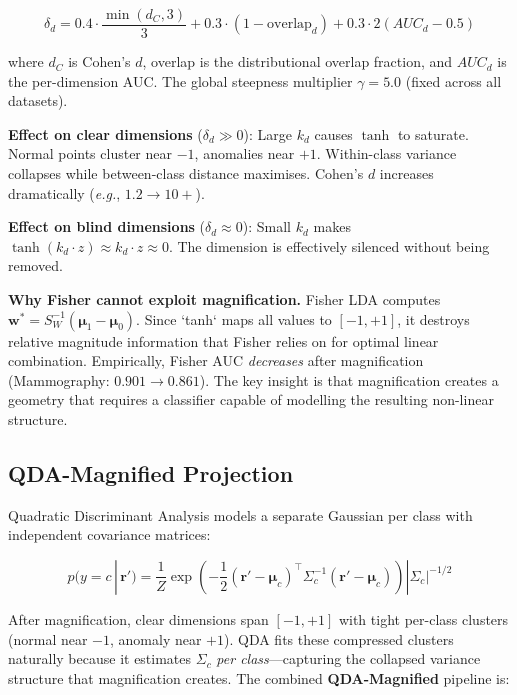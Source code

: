 \documentclass[journal]{IEEEtran}
\newcommand{\eg}{\textit{e.g.}}
\begin{document}
\begin{equation}
\delta_d = 0.4 \cdot \frac{\min(d_C, 3)}{3} + 0.3 \cdot (1 - \text{overlap}_d) + 0.3 \cdot 2(AUC_d - 0.5)
\label{eq:disc_score}
\end{equation}

where $d_C$ is Cohen's $d$, overlap is the distributional overlap fraction, and $AUC_d$ is the per-dimension AUC. The global steepness multiplier $\gamma = 5.0$ (fixed across all datasets).

\textbf{Effect on clear dimensions} ($\delta_d \gg 0$): Large $k_d$ causes $\tanh$ to saturate. Normal points cluster near $-1$, anomalies near $+1$. Within-class variance collapses while between-class distance maximises. Cohen's $d$ increases dramatically (\eg, $1.2 \to 10+$).

\textbf{Effect on blind dimensions} ($\delta_d \approx 0$): Small $k_d$ makes $\tanh(k_d \cdot z) \approx k_d \cdot z \approx 0$. The dimension is effectively silenced without being removed.

\textbf{Why Fisher cannot exploit magnification.} Fisher LDA computes $\mathbf{w}^* = S_W^{-1}(\boldsymbol{\mu}_1 - \boldsymbol{\mu}_0)$. Since `tanh` maps all values to $[-1, +1]$, it destroys relative magnitude information that Fisher relies on for optimal linear combination. Empirically, Fisher AUC \textit{decreases} after magnification (Mammography: $0.901 \to 0.861$). The key insight is that magnification creates a geometry that requires a classifier capable of modelling the resulting non-linear structure.

\subsection{QDA-Magnified Projection}
\label{ssec:qda}

Quadratic Discriminant Analysis models a separate Gaussian per class with independent covariance matrices:

\begin{equation}
p(y{=}c \,|\, \mathbf{r}') = \frac{1}{Z} \exp\!\left(-\frac{1}{2}(\mathbf{r}' - \boldsymbol{\mu}_c)^\top \Sigma_c^{-1} (\mathbf{r}' - \boldsymbol{\mu}_c)\right) |\Sigma_c|^{-1/2}
\label{eq:qda}
\end{equation}

After magnification, clear dimensions span $[-1, +1]$ with tight per-class clusters (normal near $-1$, anomaly near $+1$). QDA fits these compressed clusters naturally because it estimates $\Sigma_c$ \textit{per class}---capturing the collapsed variance structure that magnification creates. The combined \textbf{QDA-Magnified} pipeline is:
\end{document}
